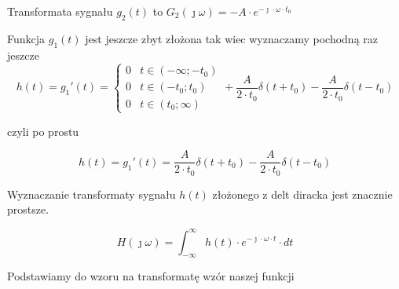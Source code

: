 \begin{task}
Transformata sygnału $g_2(t)$ to $G_2(\jmath \omega)=-A \cdot e^{-\jmath \cdot \omega \cdot t_0}$

Funkcja $g_1(t)$ jest jeszcze zbyt złożona tak wiec wyznaczamy pochodną raz jeszcze 
\begin{equation}
h(t)=g_1'(t)=\begin{cases}
0 & t \in \left( -\infty; -t_0 \right ) \\
0 & t \in \left( -t_0; t_0 \right ) \\
0 & t \in \left( t_0; \infty \right )
\end{cases} + \frac{A}{2\cdot t_0} \delta(t+t_0) - \frac{A}{2\cdot t_0} \delta(t-t_0)
\end{equation}

czyli po prostu

\begin{equation}
h(t)=g_1'(t)= \frac{A}{2\cdot t_0} \delta(t+t_0) - \frac{A}{2\cdot t_0} \delta(t-t_0)
\end{equation}

\begin{figure}[H]
  \centering
\end{figure}

Wyznaczanie transformaty sygnału $h(t)$ złożonego z delt diracka jest znacznie prostsze. 

\begin{equation}
H(\jmath \omega )=\int_{-\infty }^{\infty}h(t) \cdot e^{-\jmath \cdot \omega \cdot t}\cdot dt
\end{equation}

Podstawiamy do wzoru na transformatę wzór naszej funkcji


\end{task}
